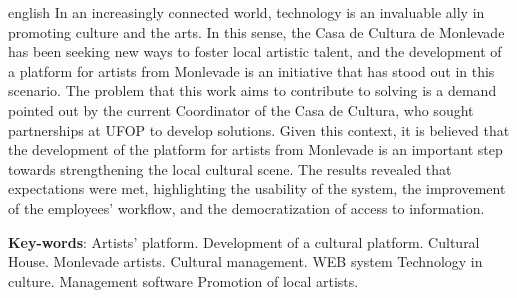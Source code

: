 \begin{resumo}[Abstract]
 \begin{otherlanguage*}{english}
  In an increasingly connected world, technology is an invaluable ally in promoting culture and the arts. In this sense, the Casa de Cultura de Monlevade has been seeking new ways to foster local artistic talent, and the development of a platform for artists from Monlevade is an initiative that has stood out in this scenario. The problem that this work aims to contribute to solving is a demand pointed out by the current Coordinator of the Casa de Cultura, who sought partnerships at UFOP to develop solutions. Given this context, it is believed that the development of the platform for artists from Monlevade is an important step towards strengthening the local cultural scene. The results revealed that expectations were met, highlighting the usability of the system, the improvement of the employees' workflow, and the democratization of access to information.

   \vspace{\onelineskip}

   \noindent
   \textbf{Key-words}: 
   Artists' platform.
   Development of a cultural platform.
   Cultural House.
   Monlevade artists.
   Cultural management.
   WEB system
   Technology in culture.
   Management software
   Promotion of local artists.
 \end{otherlanguage*}
\end{resumo}